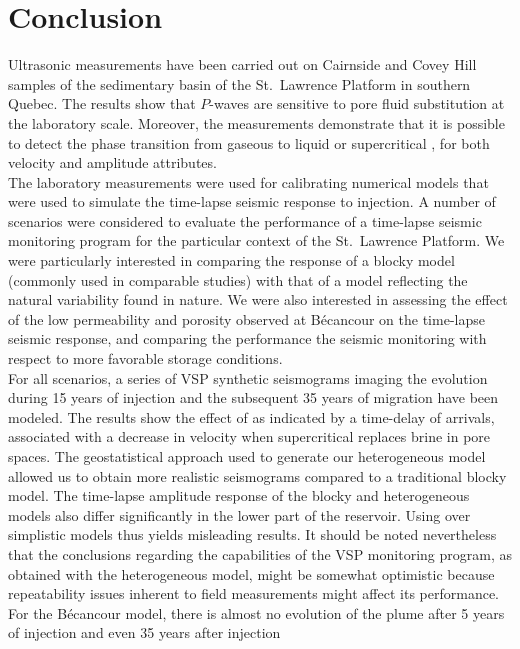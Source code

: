 \section{Conclusion}
Ultrasonic measurements have been carried out on Cairnside and Covey Hill
samples of the sedimentary basin of the St.\ Lawrence Platform in southern
Quebec. The results show that $P$-waves are sensitive to pore fluid substitution
at the laboratory scale. Moreover, the measurements demonstrate that it is
possible to detect the phase transition from gaseous  to liquid or
supercritical , for both velocity and amplitude attributes. \\
The laboratory measurements were used for calibrating numerical models that were
used to simulate the time-lapse seismic response to  injection. A number
of scenarios were considered to evaluate the performance of a time-lapse seismic
monitoring program for the particular context of the St.\ Lawrence Platform. We
were particularly interested in comparing the response of a blocky model
(commonly used in comparable studies) with that of a model reflecting the
natural variability found in nature. We were also interested in assessing the
effect of the low permeability and porosity observed at Bécancour on the
time-lapse seismic response, and comparing the performance the seismic
monitoring with respect to more favorable storage conditions.\\
For all scenarios, a series of VSP synthetic seismograms imaging the 
evolution during \num{15} years of injection and the subsequent \num{35} years
of  migration have been modeled. The results show the effect of 
as indicated by a time-delay of arrivals, associated with a decrease in velocity
when supercritical  replaces brine in pore spaces. The geostatistical
approach used to generate our heterogeneous model allowed us to obtain more
realistic seismograms compared to a traditional blocky model. The time-lapse
amplitude response of the blocky and heterogeneous models also differ
significantly in the lower part of the reservoir.  Using over simplistic models
thus yields misleading results. It should be noted nevertheless that the
conclusions regarding the capabilities of the VSP monitoring program, as
obtained with the heterogeneous model, might be somewhat optimistic because
repeatability issues inherent to field measurements might affect its
performance.\\
For the Bécancour model, there is almost no evolution of the  plume
after \num{5} years of injection and even \num{35} years after injection
